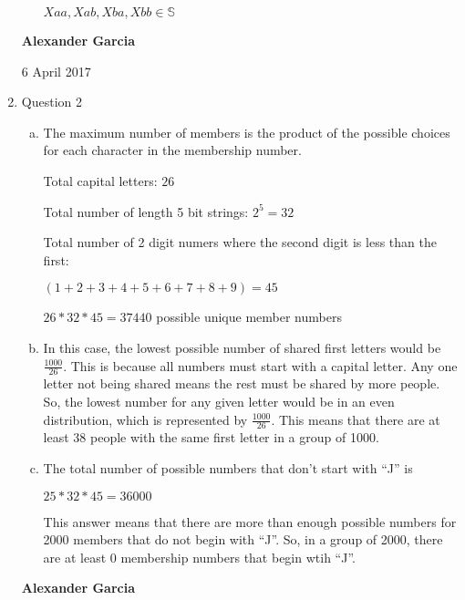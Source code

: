 \documentclass[11pt]{article}
\begin{document}
\begin{enumerate}
\begin{enumerate}[(a)]
				$Xaa, Xab, Xba, Xbb \in \mathbb{S}$

		\end{enumerate}

	\newpage

	\textbf{Alexander Garcia}

	6 April 2017 \\

	\item Question 2

		\begin{enumerate}[(a)]

			\item The maximum number of members is the product of the
				possible choices for each character in the membership
				number.

				Total capital letters: $26$

				Total number of length 5 bit strings: $2^5 = 32$

				Total number of 2 digit numers where
				the second digit is less than the first:

				$(1+2+3+4+5+6+7+8+9) = 45$

				$26 * 32 * 45 = 37440$ possible unique member numbers\\

			\item In this case, the lowest possible number of shared first letters
				would be $\frac{1000}{26} $. This is because all numbers must
				start with a capital letter. Any one letter not being shared
				means the rest must be shared by more people. So, the
				lowest number for any given letter would be in an even distribution,
				which is represented by $\frac{1000}{26} $. This means that there
				are at least 38 people with the same first letter in a group of 1000. \\

			\item The total number of possible numbers that don't start with ``J'' is

				$25 * 32 * 45 = 36000$

				This answer means that there are more than enough possible numbers
				for 2000 members that do not begin with ``J''. So, in a group of
				2000, there are at least 0 membership numbers that begin wtih ``J''.

		\end{enumerate}

		\newpage

		\textbf{Alexander Garcia}


\end{enumerate}
\end{document}

